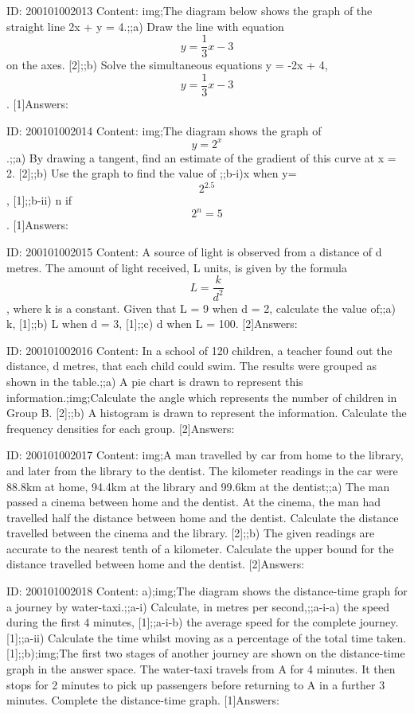\documentclass{article}
\begin{document}
ID: 200101002013
Content:
img;The diagram below shows the graph of the straight line 2x + y = 4.;;a) Draw the line with equation $$y=\frac{1}{3}x-3$$ on the axes. [2];;b) Solve the simultaneous equations y = -2x + 4, $$y=\frac{1}{3}x-3$$. [1]Answers:

ID: 200101002014
Content:
img;The diagram shows the graph of $$y=2^x$$.;;a) By drawing a tangent, find an estimate of the gradient of this curve at x = 2. [2];;b) Use the graph to find the value of ;;b-i)x when y= $$2^{2.5}$$, [1];;b-ii) n  if $$2^n=5$$. [1]Answers:

ID: 200101002015
Content:
A source of light is observed from a distance of d metres. The amount of light received, L units, is given by the formula $$L=\frac{k}{d^{2}}$$, where k is a constant. Given that L = 9 when d = 2, calculate the value of;;a) k, [1];;b) L when d = 3, [1];;c) d when L = 100. [2]Answers:

ID: 200101002016
Content:
In a school of 120 children, a teacher found out the distance, d metres, that each child could swim. The results were grouped as shown in the table.;;a) A pie chart is drawn to represent this information.;img;Calculate the angle which represents the number of children in Group B. [2];;b) A histogram is drawn to represent the information. Calculate the frequency densities for each group. [2]Answers:

ID: 200101002017
Content:
img;A man travelled by car from home to the library, and later from the library to the dentist. The kilometer readings in the car were 88.8km at home, 94.4km at the library and 99.6km at the dentist;;a) The man passed a cinema between home and the dentist. At the cinema, the man had travelled half the distance between home and the dentist. Calculate the distance travelled between the cinema and the library. [2];;b) The given readings are accurate to the nearest tenth of a kilometer. Calculate the upper bound for the distance travelled between home and the dentist. [2]Answers:

ID: 200101002018
Content:
a);img;The diagram shows the distance-time graph for a journey by water-taxi.;;a-i) Calculate, in metres per second,;;a-i-a) the speed during the first 4 minutes, [1];;a-i-b) the average speed for the complete journey. [1];;a-ii) Calculate the time whilst moving as a percentage of the total time taken. [1];;b);img;The first two stages of another journey are shown on the distance-time graph in the answer space. The water-taxi travels from A for 4 minutes. It then stops for 2 minutes to pick up passengers before returning to A in a further 3 minutes. Complete the distance-time graph. [1]Answers:
\end{document}
